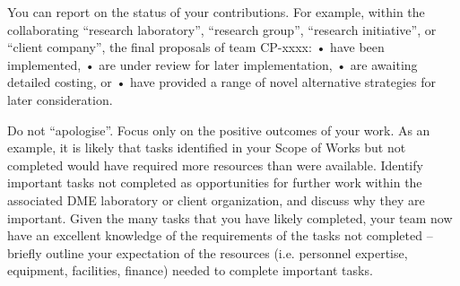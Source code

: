 You can report on the status of your contributions.  For example, within the collaborating “research laboratory”, “research group”, “research initiative”, or “client company”, the final proposals of team CP-xxxx:
•	have been implemented,
•	are under review for later implementation,
•	are awaiting detailed costing, or
•	have provided a range of novel alternative strategies for later consideration.

Do not “apologise”.  Focus only on the positive outcomes of your work.  As an example, it is likely that tasks identified in your Scope of Works but not completed would have required more resources than were available.  Identify important tasks not completed as opportunities for further work within the associated DME laboratory or client organization, and discuss why they are important.  Given the many tasks that you have likely completed, your team now have an excellent knowledge of the requirements of the tasks not completed – briefly outline your expectation of the resources (i.e. personnel expertise, equipment, facilities, finance) needed to complete important tasks.
\color{black}
